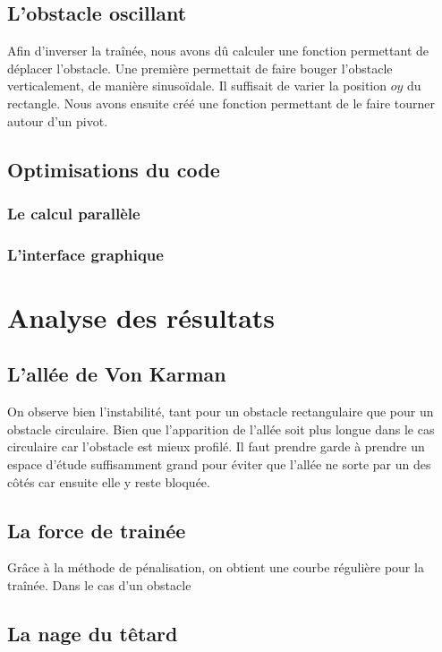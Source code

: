 		
	\subsection{L'obstacle oscillant}
		
		 Afin d'inverser la traînée, nous avons dû calculer une fonction permettant de déplacer l'obstacle. Une première permettait de faire bouger l'obstacle verticalement, de manière sinusoïdale. Il suffisait de varier la position $oy$ du rectangle. Nous avons ensuite créé une fonction permettant de le faire tourner autour d'un pivot.
		 
	\subsection{Optimisations du code}
		
		\subsubsection{Le calcul parallèle}
		
		\subsubsection{L'interface graphique}
		 
\section{Analyse des résultats}

	\subsection{L'allée de Von Karman}
	
		On observe bien l'instabilité, tant pour un obstacle rectangulaire que pour un obstacle circulaire. Bien que l'apparition de l'allée soit plus longue dans le cas circulaire car l'obstacle est mieux profilé. Il faut prendre garde à prendre un espace d'étude suffisamment grand pour éviter que l'allée ne sorte par un des côtés car ensuite elle y reste bloquée.
	
	\subsection{La force de trainée}
	
		Grâce à la méthode de pénalisation, on obtient une courbe régulière pour la traînée. Dans le cas d'un obstacle 
	
	\subsection{La nage du têtard}
	
	
	
	
		


	
